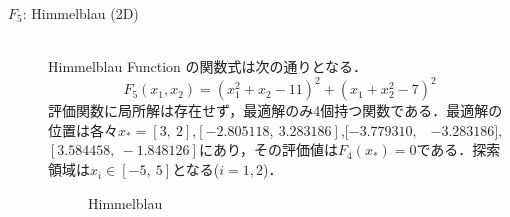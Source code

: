 \documentclass[a4j,11pt]{jarticle}
\begin{document}
\begin{description}
\item[$F_5$: Himmelblau (2D)]\mbox{}\\
Himmelblau Function \cite{himmelblau} の関数式は次の通りとなる．
\begin{equation}
\label{eq:minF5}
F_5(x_1,x_2)=(x_1^2+x_2-11)^2+(x_1+x_2^2-7)^2
\end{equation}
評価関数に局所解は存在せず，最適解のみ4個持つ関数である．最適解の位置は各々$x_*=[3, \ 2]$,$[-2.805118, \ 3.283186]$,$[-3.779310,$  \ $-3.283186],$ $[3.584458, \ -1.848126]$にあり，その評価値は$F_4(x_*)=0$である．探索領域は$x_i \in [-5, \ 5]$となる($i=1,2$)．
\begin{figure}[t]
\centering
{}
\caption{Himmelblau}
\label{fig:minF5}
\end{figure}


\end{description}
\end{document}
